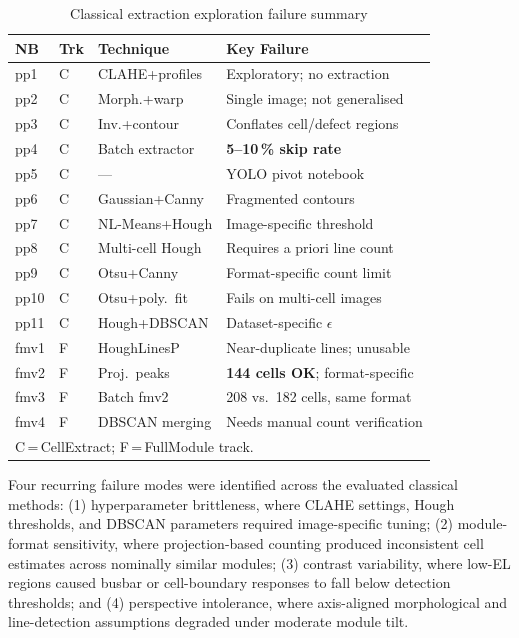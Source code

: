 \documentclass[conference]{IEEEtran}
\begin{document}
\begin{table}[t]
  \caption{Classical extraction exploration failure summary}
  \label{tab:classical_all}
  \begin{center}
  \renewcommand{\arraystretch}{1.0}\scriptsize
  \begin{tabular}{p{0.55cm}p{0.35cm}p{1.65cm}p{3.55cm}}
    \toprule
    \textbf{NB} & \textbf{Trk} & \textbf{Technique} & \textbf{Key Failure}\\
    \midrule
    pp1  & C & CLAHE+profiles   & Exploratory; no extraction\\
    pp2  & C & Morph.+warp      & Single image; not generalised\\
    pp3  & C & Inv.+contour     & Conflates cell/defect regions\\
    pp4  & C & Batch extractor  & \textbf{5--10\,\% skip rate}\\
    pp5  & C & ---              & YOLO pivot notebook\\
    pp6  & C & Gaussian+Canny   & Fragmented contours\\
    pp7  & C & NL-Means+Hough   & Image-specific threshold\\
    pp8  & C & Multi-cell Hough & Requires a priori line count\\
    pp9  & C & Otsu+Canny       & Format-specific count limit\\
    pp10 & C & Otsu+poly.\ fit  & Fails on multi-cell images\\
    pp11 & C & Hough+DBSCAN     & Dataset-specific $\epsilon$\\
    \midrule
    fmv1 & F & HoughLinesP      & Near-duplicate lines; unusable\\
    fmv2 & F & Proj.\ peaks     & \textbf{144 cells OK}; format-specific\\
    fmv3 & F & Batch fmv2       & 208 vs.\ 182 cells, same format\\
    fmv4 & F & DBSCAN merging   & Needs manual count verification\\
    \bottomrule
    \multicolumn{4}{l}{\scriptsize C\,=\,CellExtract; F\,=\,FullModule track.}
  \end{tabular}
  \end{center}
\end{table}

Four recurring failure modes were identified across the evaluated classical methods: (1) hyperparameter brittleness, where CLAHE settings, Hough thresholds, and DBSCAN parameters required image-specific tuning; (2) module-format sensitivity, where projection-based counting produced inconsistent cell estimates across nominally similar modules; (3) contrast variability, where low-EL regions caused busbar or cell-boundary responses to fall below detection thresholds; and (4) perspective intolerance, where axis-aligned morphological and line-detection assumptions degraded under moderate module tilt.
\end{document}
